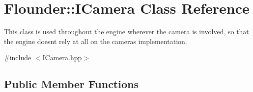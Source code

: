 \hypertarget{class_flounder_1_1_i_camera}{}\section{Flounder\+:\+:I\+Camera Class Reference}
\label{class_flounder_1_1_i_camera}


This class is used throughout the engine wherever the camera is involved, so that the engine doesn\textquotesingle{}t rely at all on the camera\textquotesingle{}s implementation.  




{\ttfamily \#include $<$I\+Camera.\+hpp$>$}

\subsection*{Public Member Functions}
